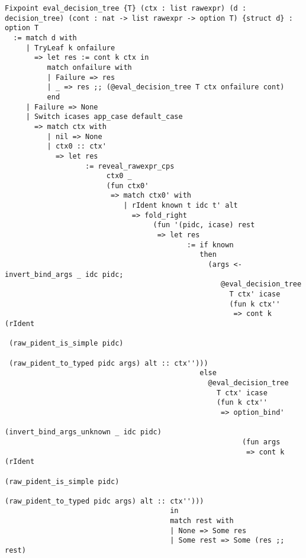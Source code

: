 \begin{itemize}
\begin{itemize}
\begin{verbatim}
Fixpoint eval_decision_tree {T} (ctx : list rawexpr) (d : decision_tree) (cont : nat -> list rawexpr -> option T) {struct d} : option T
  := match d with
     | TryLeaf k onfailure
       => let res := cont k ctx in
          match onfailure with
          | Failure => res
          | _ => res ;; (@eval_decision_tree T ctx onfailure cont)
          end
     | Failure => None
     | Switch icases app_case default_case
       => match ctx with
          | nil => None
          | ctx0 :: ctx'
            => let res
                   := reveal_rawexpr_cps
                        ctx0 _
                        (fun ctx0'
                         => match ctx0' with
                            | rIdent known t idc t' alt
                              => fold_right
                                   (fun '(pidc, icase) rest
                                    => let res
                                           := if known
                                              then
                                                (args <- invert_bind_args _ idc pidc;
                                                   @eval_decision_tree
                                                     T ctx' icase
                                                     (fun k ctx''
                                                      => cont k (rIdent
                                                                   (raw_pident_is_simple pidc)
                                                                   (raw_pident_to_typed pidc args) alt :: ctx'')))
                                              else
                                                @eval_decision_tree
                                                  T ctx' icase
                                                  (fun k ctx''
                                                   => option_bind'
                                                        (invert_bind_args_unknown _ idc pidc)
                                                        (fun args
                                                         => cont k (rIdent
                                                                      (raw_pident_is_simple pidc)
                                                                      (raw_pident_to_typed pidc args) alt :: ctx'')))
                                       in
                                       match rest with
                                       | None => Some res
                                       | Some rest => Some (res ;; rest)

\end{verbatim}
\end{itemize}
\end{itemize}
